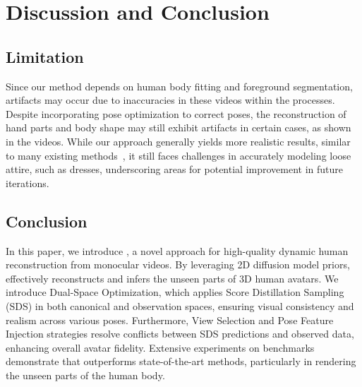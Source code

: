 \section{Discussion and Conclusion}
\subsection{Limitation}
Since our method depends on human body fitting and foreground segmentation, artifacts may occur due to inaccuracies in these videos within the processes. Despite incorporating pose optimization to correct poses, the reconstruction of hand parts and body shape may still exhibit artifacts in certain cases, as shown in the videos. While our approach generally yields more realistic results, similar to many existing methods~\cite{instant_nvr,weng2022humannerf,hu2023gaussianavatar}, it still faces challenges in accurately modeling loose attire, such as dresses, underscoring areas for potential improvement in future iterations.






\subsection{Conclusion}

In this paper, we introduce \name, a novel approach for high-quality dynamic human reconstruction from monocular videos. By leveraging 2D diffusion model priors, \name effectively reconstructs and infers the unseen parts of 3D human avatars. We introduce Dual-Space Optimization, which applies Score Distillation Sampling (SDS) in both canonical and observation spaces, ensuring visual consistency and realism across various poses. Furthermore, View Selection and Pose Feature Injection strategies resolve conflicts between SDS predictions and observed data, enhancing overall avatar fidelity. Extensive experiments on benchmarks demonstrate that \name outperforms state-of-the-art methods, particularly in rendering the unseen parts of the human body.


